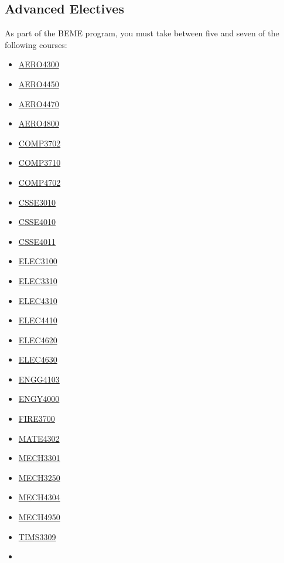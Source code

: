 \documentclass[a4paper,12pt]{report}
\begin{document}
\hypertarget{ADVANCED}{\subsection{Advanced Electives}}
As part of the BEME program, you must take between five and seven of the following courses:
\begin{multicols}{3}
    \begin{itemize}
        \item \hyperlink{AERO4300}{AERO4300}
        \item \hyperlink{AERO4450}{AERO4450}
        \item \hyperlink{AERO4470}{AERO4470}
        \item \hyperlink{AERO4800}{AERO4800}
        \item \hyperlink{COMP3702}{COMP3702}
        \item \hyperlink{COMP3710}{COMP3710}
        \item \hyperlink{COMP4702}{COMP4702}
        \item \hyperlink{CSSE3010}{CSSE3010}
        \item \hyperlink{CSSE4010}{CSSE4010}
        \item \hyperlink{CSSE4011}{CSSE4011}
        \item \hyperlink{ELEC3100}{ELEC3100}
        \item \hyperlink{ELEC3310}{ELEC3310}
        \item \hyperlink{ELEC4310}{ELEC4310}
        \item \hyperlink{ELEC4410}{ELEC4410}
        \item \hyperlink{ELEC4620}{ELEC4620}
        \item \hyperlink{ELEC4630}{ELEC4630}
        \item \hyperlink{ENGG4103}{ENGG4103}
        \item \hyperlink{ENGY4000}{ENGY4000}
        \item \hyperlink{FIRE3700}{FIRE3700}
        \item \hyperlink{MATE4302}{MATE4302}
        \item \hyperlink{MECH3301}{MECH3301}
        \item \hyperlink{MECH3250}{MECH3250}
        \item \hyperlink{MECH4304}{MECH4304}
        \item \hyperlink{MECH4950}{MECH4950}
        \item \hyperlink{TIMS3309}{TIMS3309}
        \item[]
    \end{itemize}
\end{multicols}
\end{document}
